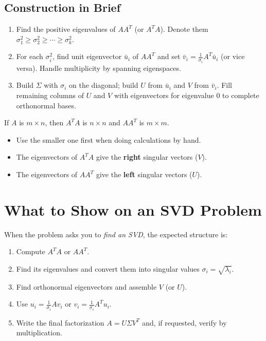 \subsection{Construction in Brief}

\begin{enumerate}
  \item Find the positive eigenvalues of $AA^T$ (or $A^TA$). Denote them $\sigma_1^2\geq\sigma_2^2\geq\cdots\geq\sigma_k^2$.
  \item For each $\sigma_i^2$, find unit eigenvector $\bar{u}_i$ of $AA^T$ and set $\bar{v}_i = \frac{1}{\sigma_i}A^T\bar{u}_i$ (or vice versa). Handle multiplicity by spanning eigenspaces.
  \item Build $\Sigma$ with $\sigma_i$ on the diagonal; build $U$ from $\bar{u}_i$ and $V$ from $\bar{v}_i$. Fill remaining columns of $U$ and $V$ with eigenvectors for eigenvalue $0$ to complete orthonormal bases.
\end{enumerate}

\begin{remark}
If $A$ is $m\times n$, then $A^TA$ is $n\times n$ and $AA^T$ is $m\times m$.
\begin{itemize}
  \item Use the smaller one first when doing calculations by hand.
  \item The eigenvectors of $A^TA$ give the \textbf{right} singular vectors ($V$).
  \item The eigenvectors of $AA^T$ give the \textbf{left} singular vectors ($U$).
\end{itemize}
\end{remark}

\section{What to Show on an SVD Problem}

When the problem asks you to \emph{find an SVD}, the expected structure is:
\begin{enumerate}
  \item Compute $A^TA$ or $AA^T$.
  \item Find its eigenvalues and convert them into singular values $\sigma_i=\sqrt{\lambda_i}$.
  \item Find orthonormal eigenvectors and assemble $V$ (or $U$).
  \item Use $u_i=\frac{1}{\sigma_i}Av_i$ or $v_i=\frac{1}{\sigma_i}A^Tu_i$.
  \item Write the final factorization $A=U\Sigma V^T$ and, if requested, verify by multiplication.
\end{enumerate}

